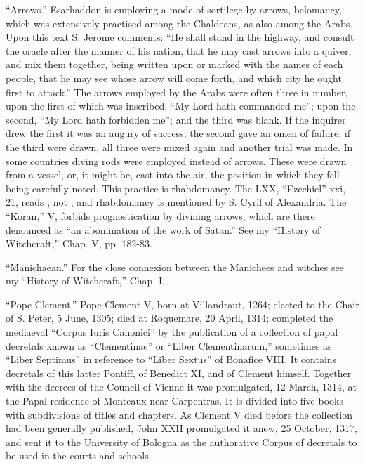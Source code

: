            “Arrows.” Esarhaddon is employing a mode of sortilege by arrows, belomancy, which
        was extensively practised among the Chaldeans, as also among the Arabs. Upon this text S.
        Jerome comments: “He shall stand in the highway, and consult the oracle after the manner
        of his nation, that he may cast arrows into a quiver, and mix them together, being written
        upon or marked with the names of each people, that he may see whose arrow will come
        forth, and which city he ought first to attack.” The arrows employed by the Arabs were often
        three in number, upon the first of which was inscribed, “My Lord hath commanded me”;
        upon the second, “My Lord hath forbidden me”; and the third was blank. If the inquirer
        drew the first it was an augury of success; the second gave an omen of failure; if the third
        were drawn, all three were mixed again and another trial was made. In some countries
        diving rods were employed instead of arrows. These were drawn from a vessel, or, it might
        be, cast into the air, the position in which they fell being carefully noted. This practice is
        rhabdomancy. The LXX, “Ezechiel” xxi, 21, reads                         , not                  ,
        and rhabdomancy is mentioned by S. Cyril of Alexandria. The “Koran,” V, forbids
        prognostication by divining arrows, which are there denounced as “an abomination of the
        work of Satan.” See my “History of Witchcraft,” Chap. V, pp. 182-83.



          “Manichaean.” For the close connexion between the Manichees and witches see my
        “History of Witchcraft,” Chap. I.



           “Pope Clement.” Pope Clement V, born at Villandraut, 1264; elected to the Chair of S.
        Peter, 5 June, 1305; died at Roquemare, 20 April, 1314; completed the mediaeval “Corpus
        Iuris Canonici” by the publication of a collection of papal decretals known as
        “Clementinae” or “Liber Clementinarum,” sometimes as “Liber Septimus” in reference to
        “Liber Sextus” of Bonafice VIII. It contains decretals of this latter Pontiff, of Benedict XI,
        and of Clement himself. Together with the decrees of the Council of Vienne it was
        promulgated, 12 March, 1314, at the Papal residence of Monteaux near Carpentras. It is
        divided into five books with subdivisions of titles and chapters. As Clement V died before the
        collection had been generally published, John XXII promulgated it anew, 25 October, 1317,
        and sent it to the University of Bologna as the authorative Corpus of decretals to be used in
        the courts and schools.

